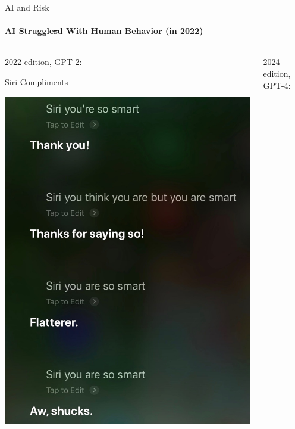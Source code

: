 \begin{frame}{AI and Risk}
  \framesubtitle{AI Struggle\sout{s}d With Human Behavior (in 2022)}
  \begin{columns}[T] %
    \begin{column}{.45\textwidth}
      {\Large 2022 edition, GPT-2}:\newline

      \href{run:graphics/siri_smart_sarcasm.m4a}{Siri Compliments}

      \begin{center}
        \includegraphics[height=0.6\textheight]{graphics/siri_transcript}
      \end{center}

    \end{column}%
    \begin{column}{.45\textwidth}
      {\Large 2024 edition, GPT-4}:\newline


\end{column}
\end{columns}
\end{frame}
